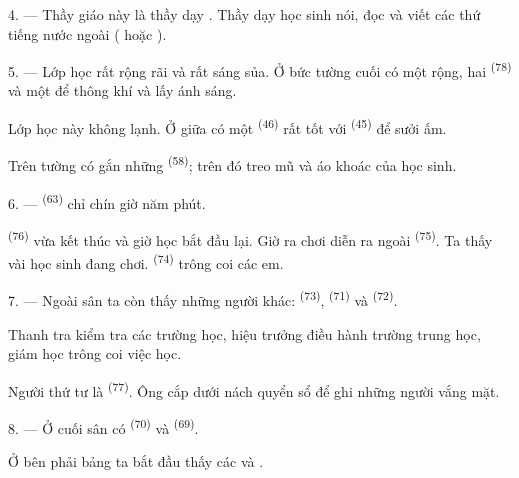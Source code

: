4. --- Thầy giáo này là thầy dạy . Thầy dạy học sinh nói, đọc và viết
các thứ tiếng nước ngoài ( hoặc ).

5. --- Lớp học rất rộng rãi và rất sáng sủa. Ở bức tường cuối có một 
rộng, hai  \textsuperscript{(78)} và một  để
thông khí và lấy ánh sáng.

Lớp học này không lạnh. Ở giữa có một  \textsuperscript{(46)} rất tốt
với  \textsuperscript{(45)} để sưởi ấm.

Trên tường có gắn những  \textsuperscript{(58)}; trên đó treo mũ và áo
khoác của học sinh.

\VUsaut{5.2mm}
\VUsaut{3.6mm}

6. ---  \textsuperscript{(63)} chỉ chín giờ năm phút.

 \textsuperscript{(76)} vừa kết thúc và giờ học bắt đầu lại. Giờ ra
chơi diễn ra ngoài  \textsuperscript{(75)}. Ta thấy vài học sinh đang chơi.
 \textsuperscript{(74)} trông coi các em.

7. --- Ngoài sân ta còn thấy những người khác:  \textsuperscript{(73)},
 \textsuperscript{(71)} và  \textsuperscript{(72)}.

Thanh tra kiểm tra các trường học, hiệu trưởng điều hành trường trung học, giám học
trông coi việc học.

Người thứ tư là  \textsuperscript{(77)}. Ông cắp dưới nách quyển
sổ để ghi những người vắng mặt.

8. --- Ở cuối sân có  \textsuperscript{(70)} và
 \textsuperscript{(69)}.

Ở bên phải bảng ta bắt đầu thấy các  và .


